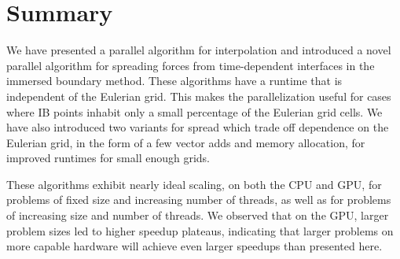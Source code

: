 \section{Summary}

We have presented a parallel algorithm for interpolation and introduced a novel parallel
algorithm for spreading forces from time-dependent interfaces in the immersed boundary
method. These algorithms have a runtime that is independent of the Eulerian grid. This
makes the parallelization useful for cases where IB points inhabit only a small
percentage of the Eulerian grid cells. We have also introduced two variants for spread
which trade off dependence on the Eulerian grid, in the form of a few vector adds and
memory allocation, for improved runtimes for small enough grids.

These algorithms exhibit nearly ideal scaling, on both the CPU and GPU, for problems of
fixed size and increasing number of threads, as well as for problems of increasing size
and number of threads.  We observed that on the GPU, larger problem sizes led to higher
speedup plateaus, indicating that larger problems on more capable hardware will achieve
even larger speedups than presented here.

